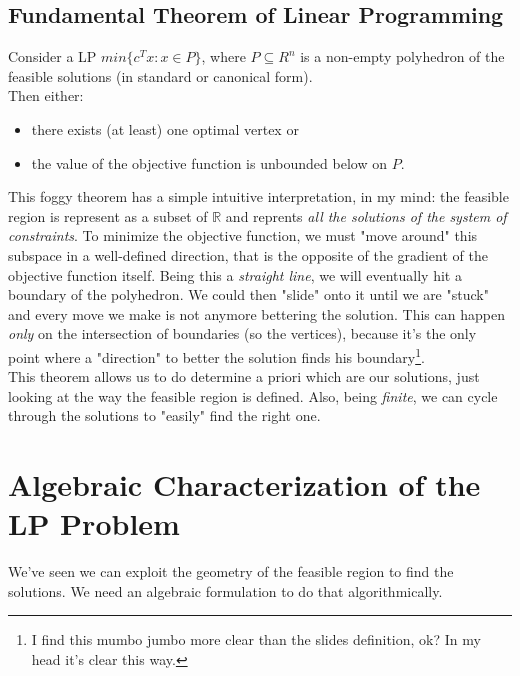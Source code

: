             \subsection{Fundamental Theorem of Linear Programming}
                \begin{theorem}
                Consider a LP $min\{c^T x : x \in P\}$, where $P \subseteq R^n$ is a non-empty polyhedron of the feasible solutions (in standard or canonical form).\\
                Then either:
                \begin{itemize}
                    \item  there exists (at least) one optimal vertex or
                    \item the value of the objective function is unbounded below on $P$.
                \end{itemize}
               
                \end{theorem}
                This foggy theorem has a simple intuitive interpretation, in my mind: the feasible region is represent as a subset of $\mathbb{R}$ and reprents \textit{all the solutions of the system of constraints}. To minimize the objective function, we must "move around" this subspace in a well-defined direction, that is the opposite of the gradient of the objective function itself. Being this a \textit{straight line}, we will eventually hit a boundary of the polyhedron. We could then "slide" onto it until we are "stuck" and every move we make is not anymore bettering the solution. This can happen \textit{only} on the intersection of boundaries (so the vertices), because it's the only point where a "direction" to better the solution finds his boundary\footnote{I find this mumbo jumbo more clear than the slides definition, ok? In my head it's clear this way.}.\\
                
                This theorem allows us to do determine a priori which are our solutions, just looking at the way the feasible region is defined. Also, being \textit{finite}, we can cycle through the solutions to "easily" find the right one.

    \section{Algebraic Characterization of the LP Problem}
        We've seen we can exploit the geometry of the feasible region to find the solutions. We need an algebraic formulation to do that algorithmically.

